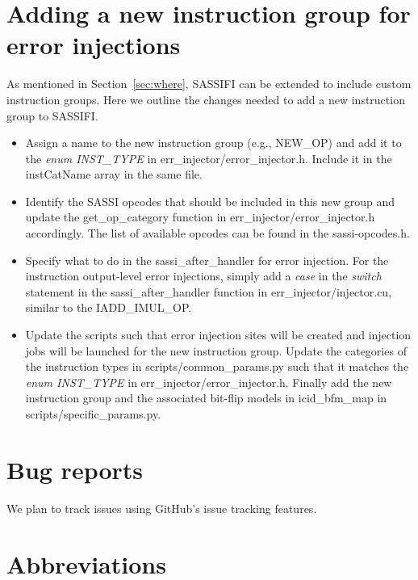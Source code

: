 \section{Adding a new instruction group for error injections}
\label{sec:new_inst_group}

As mentioned in Section~\ref{sec:where}, SASSIFI can be extended to include
custom instruction groups. Here we outline the changes needed to add a new
instruction group to SASSIFI. 

\begin{itemize}
\item Assign a name to the new instruction group (e.g., NEW\_OP) and add it to
the {\it enum INST\_TYPE} in err\_injector/error\_injector.h. Include it in the
instCatName array in the same file. 

\item Identify the SASSI opcodes that should be included in this new group and
update the get\_op\_category function in err\_injector/error\_injector.h
accordingly. The list of available opcodes can be found in the sassi-opcodes.h.

\item Specify what to do in the sassi\_after\_handler for error injection. For
the instruction output-level error injections, simply add a {\it case} in the
{\it switch} statement in the sassi\_after\_handler function in
err\_injector/injector.cu, similar to the IADD\_IMUL\_OP.

\item Update the scripts such that error injection sites will be created and
injection jobs will be launched for the new instruction group. Update the
categories of the instruction types in scripts/common\_params.py such that it
matches the  {\it enum INST\_TYPE} in err\_injector/error\_injector.h.  Finally
add the new instruction group and the associated bit-flip models in
icid\_bfm\_map in scripts/specific\_params.py.

\end{itemize}


\section{Bug reports}

We plan to track issues using GitHub's issue tracking features.

\section{Abbreviations}


